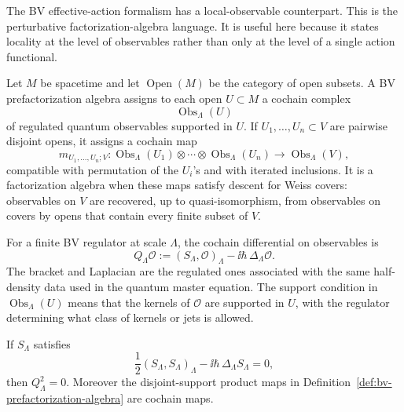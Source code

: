 The BV effective-action formalism has a local-observable counterpart.  This is
the perturbative factorization-algebra language.  It is useful here because it
states locality at the level of observables rather than only at the level of a
single action functional.

\begin{definition}
\label{def:bv-prefactorization-algebra}
Let \(M\) be spacetime and let \(\operatorname{Open}(M)\) be the category of
open subsets.  A BV prefactorization algebra assigns to each open
\(U\subset M\) a cochain complex
\[
  \operatorname{Obs}_\Lambda(U)
\]
of regulated quantum observables supported in \(U\).  If
\(U_1,\ldots,U_n\subset V\) are pairwise disjoint opens, it assigns a
cochain map
\[
  m_{U_1,\ldots,U_n;V}:
  \operatorname{Obs}_\Lambda(U_1)\otimes\cdots\otimes
  \operatorname{Obs}_\Lambda(U_n)
  \longrightarrow
  \operatorname{Obs}_\Lambda(V),
\]
compatible with permutation of the \(U_i\)'s and with iterated inclusions.
It is a factorization algebra when these maps satisfy descent for Weiss
covers: observables on \(V\) are recovered, up to quasi-isomorphism, from
observables on covers by opens that contain every finite subset of \(V\).
\end{definition}

For a finite BV regulator at scale \(\Lambda\), the cochain differential on
observables is
\begin{equation}
  Q_\Lambda\mathcal O
  :=
  (S_\Lambda,\mathcal O)_\Lambda
  -
  \ii\hbar\,\Delta_\Lambda\mathcal O .
  \label{eq:bv-quantum-observable-differential}
\end{equation}
The bracket and Laplacian are the regulated ones associated with the same
half-density data used in the quantum master equation.  The support
condition in \(\operatorname{Obs}_\Lambda(U)\) means that the kernels of
\(\mathcal O\) are supported in \(U\), with the regulator determining what
class of kernels or jets is allowed.

\begin{proposition}
\label{prop:qme-observable-differential}
If \(S_\Lambda\) satisfies
\[
  \frac12(S_\Lambda,S_\Lambda)_\Lambda
  -
  \ii\hbar\,\Delta_\Lambda S_\Lambda=0,
\]
then \(Q_\Lambda^2=0\).  Moreover the disjoint-support product maps in
Definition~\ref{def:bv-prefactorization-algebra} are cochain maps.
\end{proposition}

